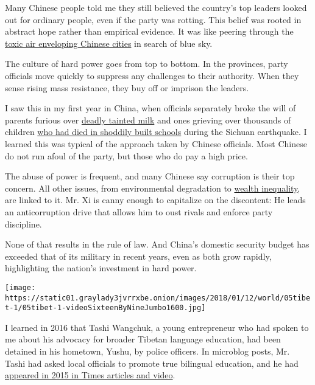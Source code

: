 Many Chinese people told me they still believed the country's top
leaders looked out for ordinary people, even if the party was rotting.
This belief was rooted in abstract hope rather than empirical evidence.
It was like peering through the
\href{http://www.nytimes3xbfgragh.onion/2013/08/04/sunday-review/life-in-a-toxic-country.html}{toxic
air enveloping Chinese cities} in search of blue sky.

The culture of hard power goes from top to bottom. In the provinces,
party officials move quickly to suppress any challenges to their
authority. When they sense rising mass resistance, they buy off or
imprison the leaders.

I saw this in my first year in China, when officials separately broke
the will of parents furious over
\href{http://www.nytimes3xbfgragh.onion/2008/10/17/world/asia/17milk.html}{deadly
tainted milk} and ones grieving over thousands of children
\href{http://www.nytimes3xbfgragh.onion/2008/09/05/world/asia/05china.html}{who
had died in shoddily built schools} during the Sichuan earthquake. I
learned this was typical of the approach taken by Chinese officials.
Most Chinese do not run afoul of the party, but those who do pay a high
price.

The abuse of power is frequent, and many Chinese say corruption is their
top concern. All other issues, from environmental degradation to
\href{http://www.nytimes3xbfgragh.onion/2012/10/26/business/global/family-of-wen-jiabao-holds-a-hidden-fortune-in-china.html}{wealth
inequality}, are linked to it. Mr. Xi is canny enough to capitalize on
the discontent: He leads an anticorruption drive that allows him to oust
rivals and enforce party discipline.

None of that results in the rule of law. And China's domestic security
budget has exceeded that of its military in recent years, even as both
grow rapidly, highlighting the nation's investment in hard power.

\texttt{[image: https://static01.graylady3jvrrxbe.onion/images/2018/01/12/world/05tibet-1/05tibet-1-videoSixteenByNineJumbo1600.jpg]}

I learned in 2016 that Tashi Wangchuk, a young entrepreneur who had
spoken to me about his advocacy for broader Tibetan language education,
had been detained in his hometown, Yushu, by police officers. In
microblog posts, Mr. Tashi had asked local officials to promote true
bilingual education, and he had
\href{https://www.nytimes3xbfgragh.onion/2015/11/29/world/asia/china-tibet-language-education.html?_r=0}{appeared
in 2015 in Times articles and video}.


